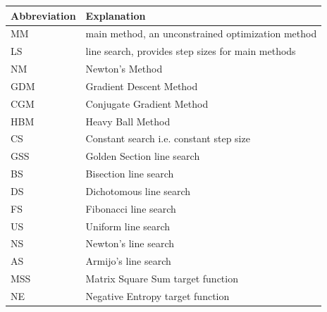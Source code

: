 \documentclass[a4paper,english,titlepage,12pt]{article}
\begin{document}
\begin{table}[H]
  \label{tab:abbreviations}
  \centering
  \begin{tabular}{|l|l|}
  \hline
  \rowcolor{gray!25}
  \textbf{Abbreviation} & \textbf{Explanation} \\
  \hline
  MM                    & main method, an unconstrained optimization method                               \\
  LS                    & line search, provides step sizes for main methods                               \\
  NM                    & Newton's Method                                                                 \\
  GDM                   & Gradient Descent Method                                                         \\
  CGM                   & Conjugate Gradient Method                                                       \\
  HBM                   & Heavy Ball Method                                                               \\
  CS                    & Constant search i.e. constant step size                                         \\
  GSS                   & Golden Section line search                                                      \\
  BS                    & Bisection line search                                                           \\
  DS                    & Dichotomous line search                                                         \\
  FS                    & Fibonacci line search                                                           \\
  US                    & Uniform line search                                                             \\
  NS                    & Newton's line search                                                            \\
  AS                    & Armijo's line search                                                            \\
  MSS                   & Matrix Square Sum target function                                               \\
  NE                    & Negative Entropy target function                                                \\
  \hline
  \end{tabular}
\end{table}
\end{document}
